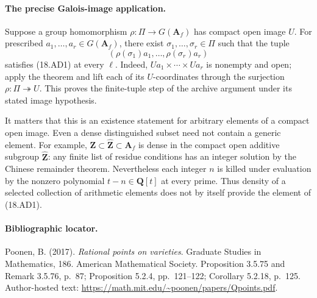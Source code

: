 \paragraph{The precise Galois-image application.}
Suppose a group homomorphism
\(\rho:\Pi\to G(\mathbf A_f)\) has compact open image \(U\).
For prescribed \(a_1,\ldots,a_r\in G(\mathbf A_f)\), there
exist \(\sigma_1,\ldots,\sigma_r\in\Pi\) such that the tuple
\[
       (\rho(\sigma_1)a_1,\ldots,\rho(\sigma_r)a_r)
 \tag{18.AD3}
\]
satisfies (18.AD1) at every \(\ell\).  Indeed,
\(Ua_1\times\cdots\times Ua_r\) is nonempty and open; apply
the theorem and lift each of its \(U\)-coordinates through
the surjection \(\rho:\Pi\twoheadrightarrow U\).
This proves the finite-tuple step of the archive argument under
its stated image hypothesis.

It matters that this is an existence statement for arbitrary
elements of a compact open image.  Even a dense distinguished
subset need not contain a generic element.  For example,
\(\mathbf Z\subset\widehat{\mathbf Z}\subset\mathbf A_f\)
is dense in the compact open additive subgroup
\(\widehat{\mathbf Z}\): any finite list of residue conditions
has an integer solution by the Chinese remainder theorem.
Nevertheless each integer \(n\) is killed under evaluation by
the nonzero polynomial \(t-n\in\mathbf Q[t]\) at every prime.
Thus density of a selected collection of arithmetic elements
does not by itself provide the element of (18.AD1).

\paragraph{Bibliographic locator.}
Poonen, B. (2017). \emph{Rational points on varieties}.
Graduate Studies in Mathematics, 186. American Mathematical Society.
Proposition 3.5.75 and Remark 3.5.76, p.~87;
Proposition 5.2.4, pp.~121--122; Corollary 5.2.18, p.~125.
Author-hosted text:
\url{https://math.mit.edu/~poonen/papers/Qpoints.pdf}.

